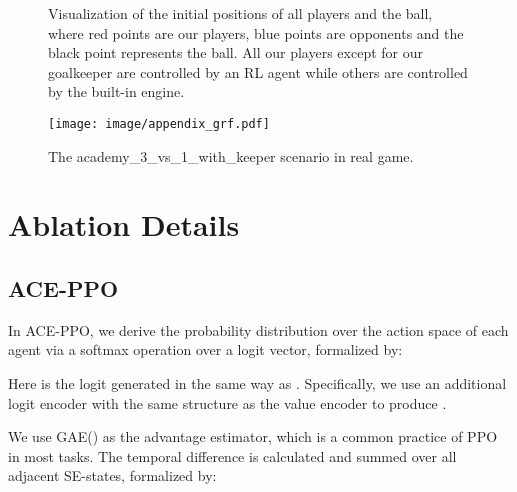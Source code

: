 \documentclass[letterpaper]{article} \usepackage{aaai23}  \usepackage{times}  \usepackage{helvet}  \usepackage{courier}  \usepackage[hyphens]{url}  \usepackage{graphicx} \urlstyle{rm} \def\UrlFont{\rm}  \usepackage{natbib}  \usepackage{caption} \frenchspacing  \setlength{\pdfpagewidth}{8.5in} \setlength{\pdfpageheight}{11in} \usepackage{algorithm}
\begin{document}
\begin{figure}[t]
  \centering
{}
\hspace{3ex}
  \caption{Visualization of the initial positions of all players and the ball, where red points are our players, blue points are opponents and the black point represents the ball. All our players except for our goalkeeper are controlled by an RL agent while others are controlled by the built-in engine.}
 \label{appendix:grf_vis}
 \vspace{-3ex}
\end{figure}

\begin{figure*}[h]
    \centering
    \texttt{[image: image/appendix\_grf.pdf]}
\vspace{-0.2cm}
    \caption{The academy\_3\_vs\_1\_with\_keeper scenario in real game.
}
\vspace{-3ex}
    \label{appendix:grf}
\end{figure*}

\section{Ablation Details}
\label{sec: ablation}
\subsection{ACE-PPO}
In ACE-PPO, we derive the probability distribution over the action space of each agent via a softmax operation over a logit vector, formalized by:

Here  is the logit generated in the same way as . Specifically, we use an additional logit encoder with the same structure as the value encoder to produce .

We use GAE() as the advantage estimator, which is a common practice of PPO in most tasks. The temporal difference is calculated and summed over all adjacent SE-states, formalized by:
\end{document}
